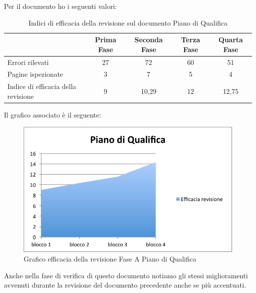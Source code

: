 						Per il documento  ho i seguenti valori:	
						\begin{table}[H]\centering
							\begin{tabu}{| l | c | c | c | c |}
								\hline
													&Prima Fase 	& Seconda Fase	& Terza Fase	& Quarta Fase  \\ \hline
												
								Errori rilevati				& 27		& 72 		& 60			& 51 	 \\ \hline
								Pagine ispezionate			& 3			& 7 			& 5				& 4	 	 \\ \hline\hline
							
								Indice di efficacia della revisione 	& 9		& 10,29 		& 12			& 12,75 	 \\ \hline
							\end{tabu}
							\caption{Indici di efficacia della revisione sul documento Piano di Qualifica}
						\end{table}
						Il grafico associato è il seguente:
						\begin{figure}[H]\centering
							\includegraphics[width=12cm]{PianoDiQualifica/Pics/EfficaciaPdQFaseA.pdf}
							\caption{Grafico efficacia della revisione Fase A Piano di Qualifica}
						\end{figure}
						Anche nella fase di verifica di questo documento notiamo gli stessi miglioramenti avvenuti durante la revisione del documento precedente anche se più accentuati.\\
						
